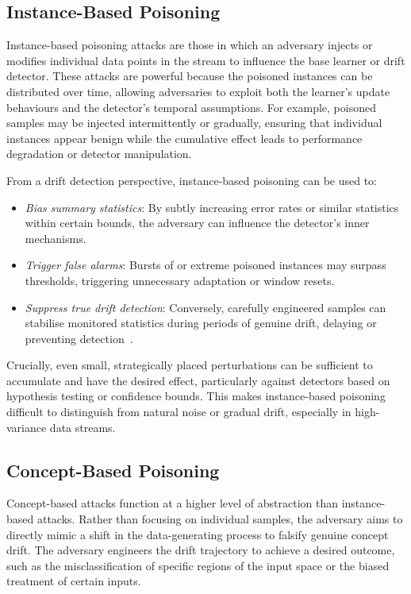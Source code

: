 \subsection{Instance-Based Poisoning}
Instance-based poisoning attacks are those in which an adversary injects or modifies individual data points in the stream to influence the base learner or drift detector. These attacks are powerful because the poisoned instances can be distributed over time, allowing adversaries to exploit both the learner’s update behaviours and the detector’s temporal assumptions. For example, poisoned samples may be injected intermittently or gradually, ensuring that individual instances appear benign while the cumulative effect leads to performance degradation or detector manipulation.

From a drift detection perspective, instance-based poisoning can be used to:
\begin{itemize}
    \item \textit{Bias summary statistics}: By subtly increasing error rates or similar statistics within certain bounds, the adversary can influence the detector's inner mechanisms.
    \item \textit{Trigger false alarms}: Bursts of or extreme poisoned instances may surpass thresholds, triggering unnecessary adaptation or window resets.
    \item \textit{Suppress true drift detection}: Conversely, carefully engineered samples can stabilise monitored statistics during periods of genuine drift, delaying or preventing detection~\cite{Korycki_2022}.
\end{itemize}

Crucially, even small, strategically placed perturbations can be sufficient to accumulate and have the desired effect, particularly against detectors based on hypothesis testing or confidence bounds. This makes instance-based poisoning difficult to distinguish from natural noise or gradual drift, especially in high-variance data streams.


\subsection{Concept-Based Poisoning}
Concept-based attacks function at a higher level of abstraction than instance-based attacks. Rather than focusing on individual samples, the adversary aims to directly mimic a shift in the data-generating process to falsify genuine concept drift. The adversary engineers the drift trajectory to achieve a desired outcome, such as the misclassification of specific regions of the input space or the biased treatment of certain inputs.

